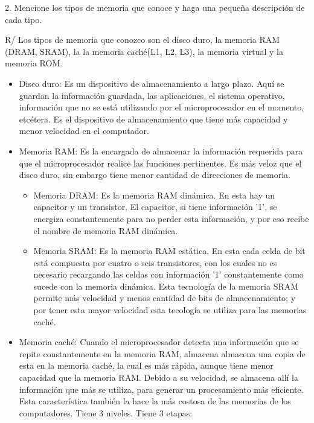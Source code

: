 \documentclass{article}
\begin{document}
\vspace{1.0cm}
2. Mencione los tipos de memoria que conoce y haga una pequeña descripción de cada tipo.

\vspace{0.3cm}
R/ Los tipos de memoria que conozco son el disco duro, la memoria RAM (DRAM, SRAM), la la memoria caché(L1, L2, L3), la memoria virtual y la memoria ROM.

\begin{itemize}

    \item Disco duro:
    Es un dispositivo de almacenamiento a largo plazo. Aquí se guardan la información guardada, las aplicaciones, el sistema operativo, información que no se está utilizando por el microprocesador en el momento, etcétera. Es el dispositivo de almacenamiento que tiene más capacidad y menor velocidad en el computador.
    
    \item Memoria RAM:
    Es la encargada de almacenar la información requerida para que el microprocesador realice las funciones pertinentes. Es más veloz que el disco duro, sin embargo tiene menor cantidad de direcciones de memoria.
    
    \begin{itemize}
    
        \item Memoria DRAM:
        Es la memoria RAM dinámica. En esta hay un capacitor y un transistor. El capacitor, si tiene información '1', se energiza constantemente para no perder esta información, y por eso recibe el nombre de memoria RAM dinámica.
        
        \item Memoria SRAM:
        Es la memoria RAM estática. En esta cada celda de bit está compuesta por cuatro o seis transistores, con los cuales no es necesario recargando las celdas con información '1' constantemente como sucede con la memoria dinámica. Esta tecnología de la memoria SRAM permite más velocidad y menos cantidad de bits de almacenamiento; y por tener esta mayor velocidad esta tecología se utiliza para las memorias caché.
    
    \end{itemize}


    \item Memoria caché:
    Cuando el microprocesador detecta una información que se repite constantemente en la memoria RAM, almacena almacena una copia de esta en la memoria caché, la cual es más rápida, aunque tiene menor capacidad que la memoria RAM. Debido a su velocidad, se almacena allí la información que más se utiliza, para generar un procesamiento más eficiente. Esta característica también la hace la más costosa de las memorias de los computadores. Tiene 3 niveles.
    Tiene 3 etapas:
    

\end{itemize}
\end{document}
